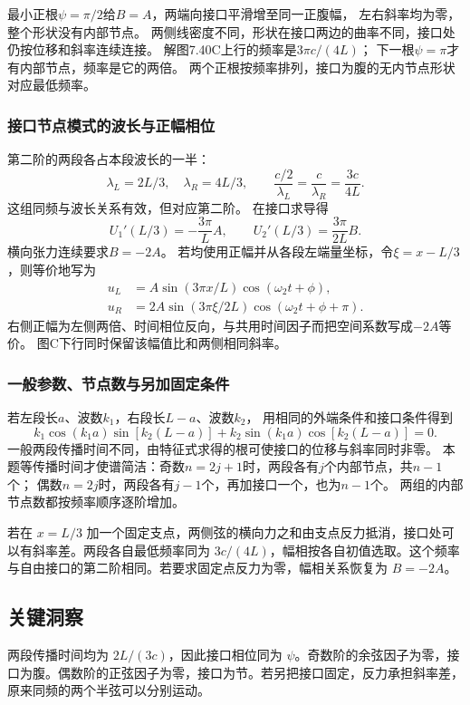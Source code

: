 \documentclass[UTF8,fontset=fandol,a4paper,11pt]{ctexart}
\begin{document}
最小正根$\psi=\pi/2$给$B=A$，两端向接口平滑增至同一正腹幅，
左右斜率均为零，整个形状没有内部节点。
两侧线密度不同，形状在接口两边的曲率不同，接口处仍按位移和斜率连续连接。
解图7.40C上行的频率是$3\pi c/(4L)$；
下一根$\psi=\pi$才有内部节点，频率是它的两倍。
两个正根按频率排列，接口为腹的无内节点形状对应最低频率。

\subsubsection*{接口节点模式的波长与正幅相位}
第二阶的两段各占本段波长的一半：
\[
\lambda_L=2L/3,\quad\lambda_R=4L/3,\qquad
\frac{c/2}{\lambda_L}=\frac{c}{\lambda_R}=\frac{3c}{4L}.
\]
这组同频与波长关系有效，但对应第二阶。
在接口求导得
\[
U_1'(L/3)=-\frac{3\pi}{L}A,\qquad
U_2'(L/3)=\frac{3\pi}{2L}B.
\]
横向张力连续要求$B=-2A$。
若均使用正幅并从各段左端量坐标，令$\xi=x-L/3$，则等价地写为
\[
\begin{aligned}
u_L&=A\sin(3\pi x/L)\cos(\omega_2t+\phi),\\
u_R&=2A\sin(3\pi\xi/2L)\cos(\omega_2t+\phi+\pi).
\end{aligned}
\]
右侧正幅为左侧两倍、时间相位反向，与共用时间因子而把空间系数写成$-2A$等价。
图C下行同时保留该幅值比和两侧相同斜率。

\subsubsection*{一般参数、节点数与另加固定条件}
若左段长$a$、波数$k_1$，右段长$L-a$、波数$k_2$，
用相同的外端条件和接口条件得到
\[
k_1\cos(k_1a)\sin[k_2(L-a)]
+k_2\sin(k_1a)\cos[k_2(L-a)]=0.
\]
一般两段传播时间不同，由特征式求得的根可使接口的位移与斜率同时非零。
本题等传播时间才使谱简洁：奇数$n=2j+1$时，两段各有$j$个内部节点，共$n-1$个；
偶数$n=2j$时，两段各有$j-1$个，再加接口一个，也为$n-1$个。
两组的内部节点数都按频率顺序逐阶增加。

若在 $x=L/3$ 加一个固定支点，两侧弦的横向力之和由支点反力抵消，接口处可以有斜率差。两段各自最低频率同为 $3c/(4L)$，幅相按各自初值选取。这个频率与自由接口的第二阶相同。若要求固定点反力为零，幅相关系恢复为 $B=-2A$。




\subsection*{关键洞察}

两段传播时间均为 $2L/(3c)$，因此接口相位同为 $\psi$。奇数阶的余弦因子为零，接口为腹。偶数阶的正弦因子为零，接口为节。若另把接口固定，反力承担斜率差，原来同频的两个半弦可以分别运动。
\end{document}
